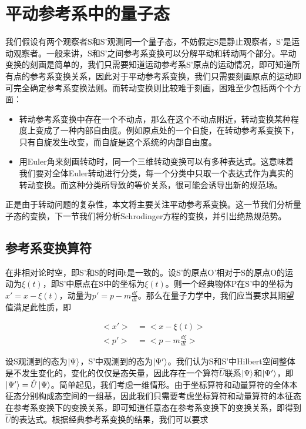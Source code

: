 \documentclass[a4paper]{article}
\begin{document}
    \section{平动参考系中的量子态}
        
        我们假设有两个观察者S和S'观测同一个量子态，不妨假定S是静止观察者，S'是运动观察者。一般来讲，S和S'之间参考系变换可以分解平动和转动两个部分。平动变换的刻画是简单的，我们只需要知道运动参考系S'原点的运动情况，即可知道所有点的参考系变换关系，因此对于平动参考系变换，我们只需要刻画原点的运动即可完全确定参考系变换法则。而转动变换则比较难于刻画，困难至少包括两个个方面：
        
        \begin{itemize}
            \item 转动参考系变换中存在一个不动点，那么在这个不动点附近，转动变换某种程度上变成了一种内部自由度。例如原点处的一个自旋，在转动参考系变换下，只有自旋发生改变，而自旋是这个系统的内部自由度。
            \item 用Euler角来刻画转动时，同一个三维转动变换可以有多种表达式。这意味着我们要对全体Euler转动进行分类，每一个分类中只取一个表达式作为真实的转动变换。而这种分类所导致的等价关系，很可能会诱导出新的规范场。
        \end{itemize}
        
        正是由于转动问题的复杂性，本文将主要关注平动参考系变换。这一节我们分析量子态的变换，下一节我们将分析Schrodinger方程的变换，并引出绝热规范势。
        
    \subsection{参考系变换算符}
    
        在非相对论时空，即S'和S的时间t是一致的。设S'的原点O'相对于S的原点O的运动为$\xi(t)$，即S'中原点在S中的坐标为$\xi(t)$。则一个经典物体P在S'中的坐标为$x'=x-\xi(t)$，动量为$p'=p-m\frac{d\xi}{dt}$。那么在量子力学中，我们应当要求其期望值满足此性质，即
    
        \begin{equation}
            \begin{split}
                <x'>&=<x-\xi(t)>      \\
                <p'>&=<p-m\frac{d\xi}{dt}>
            \end{split}
        \end{equation}
    
        设S观测到的态为$\ket{\Psi}$，S'中观测到的态为$\ket{\Psi'}$。我们认为S和S'中Hilbert空间整体是不发生变化的，变化的仅仅是态矢量，因此存在一个算符$\hat{U}$联系$\ket{\Psi}$和$\ket{\Psi'}$，即$\ket{\Psi'}=\hat{U}\ket{\Psi}$。简单起见，我们考虑一维情形。由于坐标算符和动量算符的全体本征态分别构成态空间的一组基，因此我们只需要考虑坐标算符和动量算符的本征态在参考系变换下的变换关系，即可知道任意态在参考系变换下的变换关系，即得到$\hat{U}$的表达式。根据经典参考系变换的结果，我们可以要求
\end{document}
